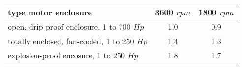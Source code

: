 \begin{tabular}{lcc}
	type motor enclosure & 3600 $rpm$ & 1800 $rpm$ \\ \hline
	open, drip-proof enclosure, 1 to 700 $Hp$ & 1.0 & 0.9 \\
	totally enclosed, fan-cooled, 1 to 250 $Hp$ & 1.4 & 1.3 \\
	explosion-proof encosure, 1 to 250 $Hp$ & 1.8 & 1.7 \\ \hline
\end{tabular}
